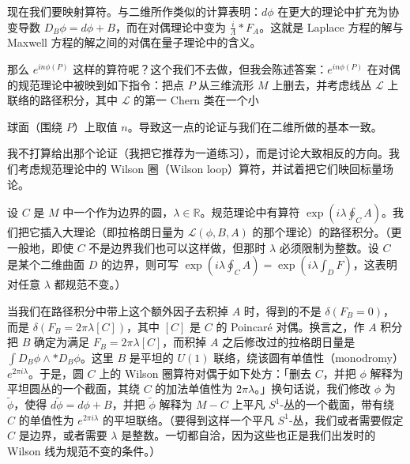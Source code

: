 
现在我们要映射算符。与二维所作类似的计算表明：$d\phi$ 在更大的理论中扩充为协变导数 $D_B\phi=d\phi+B$，而在对偶理论中变为 $\frac{i}{\Lambda}\ast F_A$。这就是 Laplace 方程的解与 Maxwell 方程的解之间的对偶在量子理论中的含义。

那么 $e^{in\phi(P)}$ 这样的算符呢？这个我们不去做，但我会陈述答案：$e^{in\phi(P)}$ 在对偶的规范理论中被映到如下指令：把点 $P$ 从三维流形 $M$ 上删去，并考虑线丛 $\mathcal{L}$ 上联络的路径积分，其中 $\mathcal{L}$ 的第一 Chern 类在一个小

球面（围绕 $P$）上取值 $n$。导致这一点的论证与我们在二维所做的基本一致。

我不打算给出那个论证（我把它推荐为一道练习），而是讨论大致相反的方向。我们考虑规范理论中的 Wilson 圈（Wilson loop）算符，并试着把它们映回标量场论。

设 $C$ 是 $M$ 中一个作为边界的圆，$\lambda\in\mathbb{R}$。规范理论中有算符 $\exp(i\lambda\oint_C A)$。我们把它插入大理论（即拉格朗日量为 $\mathcal{L}(\phi,B,A)$ 的那个理论）的路径积分。（更一般地，即使 $C$ 不是边界我们也可以这样做，但那时 $\lambda$ 必须限制为整数。设 $C$ 是某个二维曲面 $D$ 的边界，则可写 $\exp(i\lambda\oint_C A)=\exp(i\lambda\int_D F)$，这表明对任意 $\lambda$ 都规范不变。）

当我们在路径积分中带上这个额外因子去积掉 $A$ 时，得到的不是 $\delta(F_B=0)$，而是 $\delta(F_B=2\pi\lambda[C])$，其中 $[C]$ 是 $C$ 的 Poincaré 对偶。换言之，作 $A$ 积分把 $B$ 确定为满足 $F_B=2\pi\lambda[C]$，而积掉 $A$ 之后修改过的拉格朗日量是 $\int D_B\phi\wedge\ast D_B\phi$。这里 $B$ 是平坦的 $U(1)$ 联络，绕该圆有单值性（monodromy）$e^{2\pi i\lambda}$。于是，圆 $C$ 上的 Wilson 圈算符对偶于如下处方：「删去 $C$，并把 $\phi$ 解释为平坦圆丛的一个截面，其绕 $C$ 的加法单值性为 $2\pi\lambda$。」换句话说，我们修改 $\phi$ 为 $\tilde\phi$，使得 $d\tilde\phi=d\phi+B$，并把 $\tilde\phi$ 解释为 $M-C$ 上平凡 $S^1$-丛的一个截面，带有绕 $C$ 的单值性为 $e^{2\pi i\lambda}$ 的平坦联络。（要得到这样一个平凡 $S^1$-丛，我们或者需要假定 $C$ 是边界，或者需要 $\lambda$ 是整数。一切都自洽，因为这些也正是我们出发时的 Wilson 线为规范不变的条件。）


